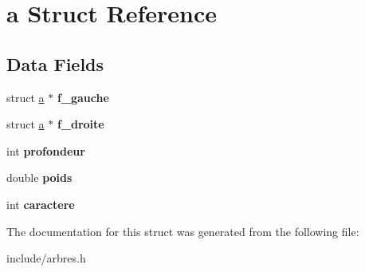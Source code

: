 \hypertarget{structa}{}\section{a Struct Reference}
\label{structa}
\subsection*{Data Fields}
\begin{DoxyCompactItemize}
\item 
\mbox{\label{structa_ae851e52858254ef96467d4084fa2a877}} 
struct \mbox{\hyperlink{structa}{a}} $\ast$ {\bfseries f\+\_\+gauche}
\item 
\mbox{\label{structa_aec48c8eb80aa03aeb170f609e2db5526}} 
struct \mbox{\hyperlink{structa}{a}} $\ast$ {\bfseries f\+\_\+droite}
\item 
\mbox{\label{structa_aa9b3fa948258da2518cebbe8cb191431}} 
int {\bfseries profondeur}
\item 
\mbox{\label{structa_acc932e3db5bea7123b52caa563a9ed1f}} 
double {\bfseries poids}
\item 
\mbox{\label{structa_aadaa003261a5b290ecca56d27164cb11}} 
int {\bfseries caractere}
\end{DoxyCompactItemize}


The documentation for this struct was generated from the following file\+:\begin{DoxyCompactItemize}
\item 
include/arbres.\+h\end{DoxyCompactItemize}
